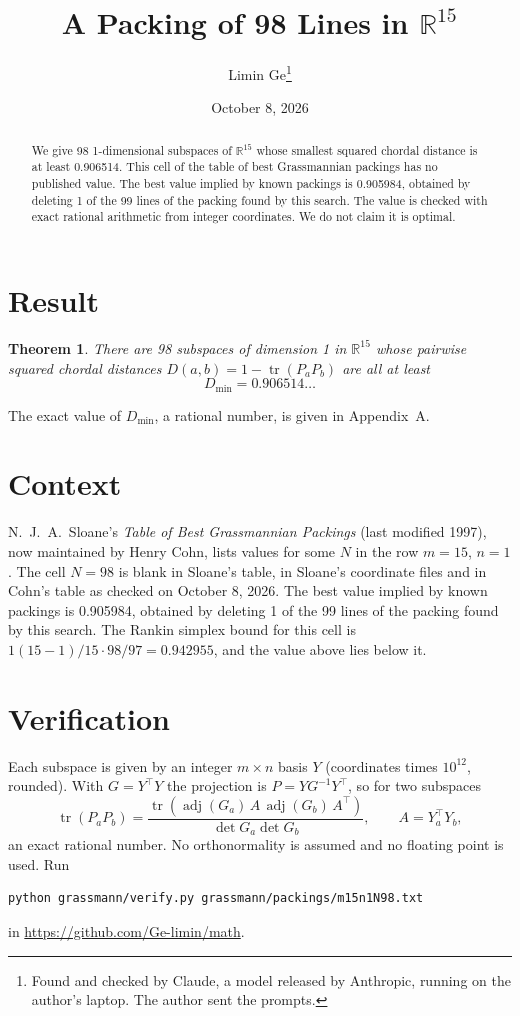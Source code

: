 \documentclass[11pt,a4paper]{article}
\title{A Packing of 98 Lines in $\mathbb{R}^{15}$}
\author{Limin Ge\thanks{Found and checked by Claude, a model released by Anthropic, running on the author's laptop. The author sent the prompts.}}
\date{October 8, 2026}
\newtheorem*{theorem}{Theorem}
\begin{document}
\maketitle
\begin{abstract}
We give 98 1-dimensional subspaces of $\mathbb{R}^{15}$ whose smallest squared chordal distance is at least 0.906514. This cell of the table of best Grassmannian packings has no published value. The best value implied by known packings is 0.905984, obtained by deleting 1 of the 99 lines of the packing found by this search. The value is checked with exact rational arithmetic from integer coordinates. We do not claim it is optimal.
\end{abstract}

\section{Result}
\begin{theorem}
There are 98 subspaces of dimension 1 in $\mathbb{R}^{15}$ whose pairwise squared chordal distances $D(a,b) = 1 - \operatorname{tr}(P_aP_b)$ are all at least
\[ D_{\min} = 0.906514\ldots \]
\end{theorem}
The exact value of $D_{\min}$, a rational number, is given in Appendix~A.


\section{Context}
N.~J.~A.~Sloane's \emph{Table of Best Grassmannian Packings} (last modified 1997), now maintained by Henry Cohn, lists values for some $N$ in the row $m=15$, $n=1$. The cell $N=98$ is blank in Sloane's table, in Sloane's coordinate files and in Cohn's table as checked on October 8, 2026. The best value implied by known packings is 0.905984, obtained by deleting 1 of the 99 lines of the packing found by this search. The Rankin simplex bound for this cell is $1(15-1)/15\cdot 98/97 = 0.942955$, and the value above lies below it.


\section{Verification}
Each subspace is given by an integer $m\times n$ basis $Y$ (coordinates times $10^{12}$, rounded). With $G=Y^\top Y$ the projection is $P=YG^{-1}Y^\top$, so for two subspaces
\[ \operatorname{tr}(P_aP_b)=\frac{\operatorname{tr}(\operatorname{adj}(G_a)\,A\,\operatorname{adj}(G_b)\,A^\top)}{\det G_a\det G_b},\qquad A=Y_a^\top Y_b, \]
an exact rational number. No orthonormality is assumed and no floating point is used. Run
\begin{verbatim}
python grassmann/verify.py grassmann/packings/m15n1N98.txt
\end{verbatim}
in \url{https://github.com/Ge-limin/math}.
\end{document}
